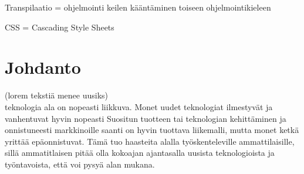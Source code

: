 \documentclass[11pt,a4paper,titlepage,oneside]{article}
\begin{document}
Transpilaatio = ohjelmointi keilen kääntäminen toiseen ohjelmointikieleen
\bigskip

CSS = Cascading Style Sheets
\bigskip



\newpage





\clearpage
\setcounter{page}{1}

\pagestyle{fancy}
\lfoot{}
\cfoot{}
\rfoot{}
\lhead{}
\chead{}
\rhead{\thepage}
\renewcommand{\headrulewidth}{0pt}
\renewcommand{\footrulewidth}{0pt}







    






\section{Johdanto}              %


















(lorem tekstiä menee uusiks)\\ %
teknologia ala on nopeasti liikkuva. 
Monet uudet teknologiat ilmestyvät ja vanhentuvat hyvin nopeasti
Suositun tuotteen tai teknologian kehittäminen ja onnistuneesti markkinoille saanti on hyvin tuottava liikemalli, 
mutta monet ketkä yrittää epäonnistuvat.\citemissing
Tämä tuo haasteita alalla työskenteleville ammattilaisille, 
sillä ammatitlaisen pitää olla kokoajan ajantasalla uusista teknologioista ja työntavoista, että voi pysyä alan mukana.
\end{document}
